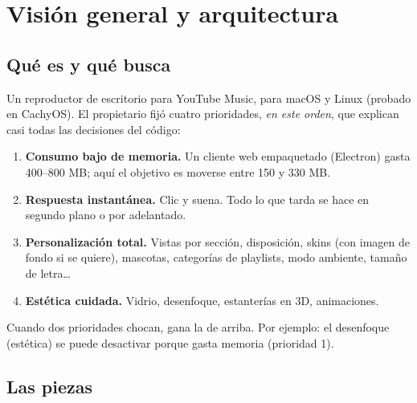 \chapter{Visión general y arquitectura}
\label{cap:arquitectura}

\section{Qué es y qué busca}

Un reproductor de escritorio para YouTube Music, para macOS y Linux (probado en CachyOS). El
propietario fijó cuatro prioridades, \emph{en este orden}, que explican casi todas las
decisiones del código:

\begin{enumerate}
  \item \textbf{Consumo bajo de memoria.} Un cliente web empaquetado (Electron) gasta 400–800
  MB; aquí el objetivo es moverse entre 150 y 330 MB.
  \item \textbf{Respuesta instantánea.} Clic y suena. Todo lo que tarda se hace en segundo
  plano o por adelantado.
  \item \textbf{Personalización total.} Vistas por sección, disposición, skins (con imagen de
  fondo si se quiere), mascotas, categorías de playlists, modo ambiente, tamaño de letra\dots
  \item \textbf{Estética cuidada.} Vidrio, desenfoque, estanterías en 3D, animaciones.
\end{enumerate}

Cuando dos prioridades chocan, gana la de arriba. Por ejemplo: el desenfoque (estética) se
puede desactivar porque gasta memoria (prioridad 1).

\section{Las piezas}

